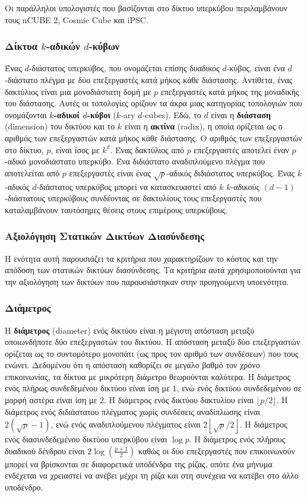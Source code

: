 \documentclass[12pt,a4paper]{article} %
\begin{document}
Οι παράλληλοι υπολογιστές που βασίζονται στο δίκτυο υπερκύβου περιλαμβάνουν 
τους nCUBE 2, Cosmic Cube και 
iPSC.

\subsubsection*{Δίκτυα $k$-αδικών $d$-κύβων}
Ένας $d$-διάστατος υπερκύβος, που ονομάζεται επίσης δυαδικός $d$-κύβος, 
είναι ένα $d$-διάστατο πλέγμα με δύο επεξεργαστές κατά μήκος κάθε διάστασης. 
Αντίθετα, ένας δακτύλιος είναι μια μονοδιάστατη δομή με $p$ επεξεργαστές 
κατά μήκος της μοναδικής του διάστασης. Αυτές οι τοπολογίες ορίζουν τα 
άκρα μιας κατηγορίας τοπολογιών που ονομάζονται \textbf{$k$-αδικοί $d$-κύβοι} 
($k$-ary $d$-cubes). Εδώ, το $d$ είναι η 
\textbf{διάσταση} (dimension) του δικτύου και 
το $k$ είναι η \textbf{ακτίνα} (radix), η οποία 
ορίζεται ως ο αριθμός των επεξεργαστών κατά μήκος κάθε διάστασης. Ο αριθμός 
των επεξεργαστών στο δίκτυο, $p$, είναι ίσος με $k^d$. Ένας δακτύλιος από 
$p$ επεξεργαστές αποτελεί έναν $p$-αδικό μονοδιάστατο υπερκύβο. Ένα 
διδιάστατο αναδιπλούμενο πλέγμα που αποτελείται από $p$ επεξεργαστές είναι 
ένας $\sqrt{p}$-αδικός διδιάστατος υπερκύβος. Ένας $k$-αδικός $d$-διάστατος 
υπερκύβος μπορεί να κατασκευαστεί από $k$ $k$-αδικούς $(d-1)$-διάστατους 
υπερκύβους συνδέοντας σε δακτυλίους τους επεξεργαστές που καταλαμβάνουν
ταυτόσημες θέσεις στους επιμέρους υπερκύβους.

\subsubsection{Αξιολόγηση Στατικών Δικτύων Διασύνδεσης}
Η ενότητα αυτή παρουσιάζει τα κριτήρια που χαρακτηρίζουν το κόστος και την 
απόδοση των στατικών δικτύων διασύνδεσης. Τα κριτήρια αυτά χρησιμοποιούνται 
για την αξιολόγηση των δικτύων που παρουσιάστηκαν στην προηγούμενη υποενότητα.

\subsubsection*{Διάμετρος}
Η \textbf{διάμετρος} (diameter) ενός δικτύου 
είναι η μέγιστη απόσταση μεταξύ οποιωνδήποτε δύο επεξεργαστών του δικτύου. 
Η απόσταση μεταξύ δύο επεξεργαστών ορίζεται ως το συντομότερο μονοπάτι 
(ως προς τον αριθμό των συνδέσεων) που τους ενώνει. Δεδομένου ότι η 
απόσταση καθορίζει σε μεγάλο βαθμό τον χρόνο επικοινωνίας, τα δίκτυα
με μικρότερη διάμετρο θεωρούνται καλύτερα. Η διάμετρος ενός πλήρως 
συνδεδεμένου δικτύου είναι ίση με 1, ενώ ενός δικτύου συνδεδεμένου σε 
μορφή αστέρα είναι ίση με $2$. Η διάμετρος ενός δικτύου δακτυλίου είναι 
$\lfloor p/2 \rfloor$. Η διάμετρος ενός διδιάστατου πλέγματος χωρίς 
συνδέσεις αναδίπλωσης είναι $2(\sqrt{p}-1)$, ενώ ενός αναδιπλούμενου πλέγματος
είναι $2\left\lfloor \sqrt{p}/2 \right\rfloor$. Η διάμετρος ενός διασυνδεδεμένου 
δικτύου υπερκύβου είναι $\log p$. Η διάμετρος ενός πλήρους δυαδικού 
δένδρου είναι $2\log\!\left(\frac{p+1}{2}\right)$ καθώς οι δύο 
επεξεργαστές που επικοινωνούν μπορεί να βρίσκονται σε διαφορετικά 
υποδένδρα της ρίζας, οπότε ένα μήνυμα ενδέχεται να χρειαστεί να ανέβει 
μέχρι τη ρίζα και στη συνέχεια να κατέβει στο άλλο υποδένδρο.
\end{document}
